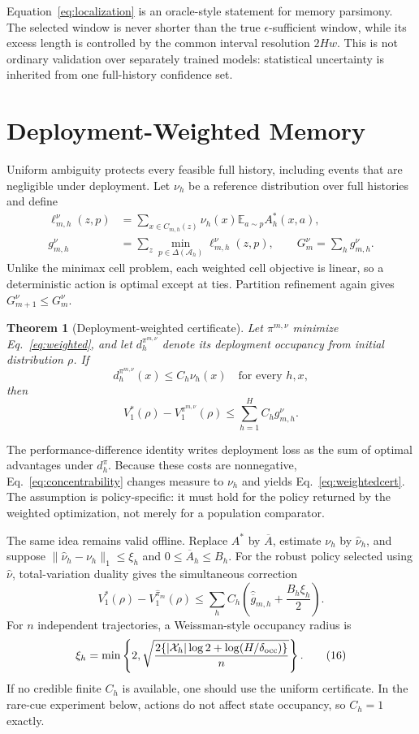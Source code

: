 \documentclass[letterpaper]{article} %
\newtheorem{theorem}{Theorem}
\theoremstyle{remark}
\newcommand{\cX}{\mathcal X}
\newcommand{\cA}{\mathcal A}
\newcommand{\E}{\mathbb E}
\begin{document}
Equation~\eqref{eq:localization} is an oracle-style statement for memory
parsimony. The selected window is never shorter than the true
$\epsilon$-sufficient window, while its excess length is controlled by the
common interval resolution $2Hw$. This is not ordinary validation over
separately trained models: statistical uncertainty is inherited from one
full-history confidence set.

\section{Deployment-Weighted Memory}

Uniform ambiguity protects every feasible full history, including events that
are negligible under deployment. Let $\nu_h$ be a reference distribution over
full histories and define
\[
\begin{aligned}
\ell_{m,h}^{\nu}(z,p)
&=\sum_{x\in C_{m,h}(z)}\nu_h(x)
  \E_{a\sim p}A_h^*(x,a),\\
g_{m,h}^{\nu}
&=\sum_z\min_{p\in\Delta(\cA_h)}\ell_{m,h}^{\nu}(z,p),
\qquad G_m^\nu=\sum_hg_{m,h}^{\nu}.
\end{aligned}
\tag{12}\label{eq:weighted}
\]
Unlike the minimax cell problem, each weighted cell objective is linear, so a
deterministic action is optimal except at ties. Partition refinement again
gives $G_{m+1}^\nu\leq G_m^\nu$.

\begin{theorem}[Deployment-weighted certificate]\label{thm:weighted}
Let $\pi^{m,\nu}$ minimize Eq.~\eqref{eq:weighted}, and let
$d_h^{\pi^{m,\nu}}$ denote its deployment occupancy from initial distribution
$\rho$. If
\[
d_h^{\pi^{m,\nu}}(x)\leq C_h\nu_h(x)
\quad\text{for every }h,x,
\tag{13}\label{eq:concentrability}
\]
then
\[
V_1^*(\rho)-V_1^{\pi^{m,\nu}}(\rho)
\leq\sum_{h=1}^H C_hg_{m,h}^{\nu}.
\tag{14}\label{eq:weightedcert}
\]
\end{theorem}

The performance-difference identity writes deployment loss as the sum of
optimal advantages under $d_h^\pi$. Because these costs are nonnegative,
Eq.~\eqref{eq:concentrability} changes measure to $\nu_h$ and yields
Eq.~\eqref{eq:weightedcert}. The assumption is policy-specific: it must hold
for the policy returned by the weighted optimization, not merely for a
population comparator.

The same idea remains valid offline. Replace $A^*$ by $\overline A$, estimate
$\nu_h$ by $\widehat\nu_h$, and suppose
$\|\widehat\nu_h-\nu_h\|_1\leq\xi_h$ and
$0\leq\overline A_h\leq B_h$. For the robust policy selected using
$\widehat\nu$, total-variation duality gives the simultaneous correction
\[
V_1^*(\rho)-V_1^{\widehat\pi_m}(\rho)
\leq\sum_h C_h\left(
\widehat{\overline g}_{m,h}+\frac{B_h\xi_h}{2}
\right).
\tag{15}\label{eq:empweighted}
\]
For $n$ independent trajectories, a Weissman-style occupancy radius is
\[
\xi_h=\min\left\{2,
\sqrt{\frac{2\{|\cX_h|\log2+\log(H/\delta_{\rm occ})\}}{n}}
\right\}.
\tag{16}\label{eq:occupancyradius}
\]
If no credible finite $C_h$ is available, one should use the uniform
certificate. In the rare-cue experiment below, actions do not affect state
occupancy, so $C_h=1$ exactly.
\end{document}
